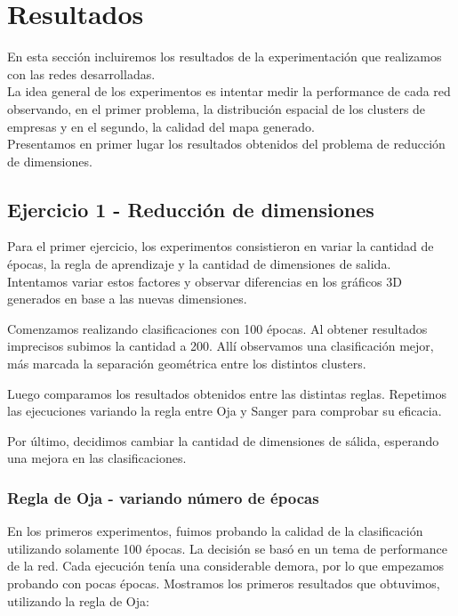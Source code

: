 \section{Resultados}
En esta sección incluiremos los resultados de la experimentación que realizamos con las redes desarrolladas.\\

La idea general de los experimentos es intentar medir la performance
de cada red observando, en el primer problema, la distribución espacial de los clusters de empresas y en el segundo, la calidad 
del mapa generado.\\

Presentamos en primer lugar los resultados obtenidos del problema de reducción de dimensiones.

\subsection{Ejercicio 1 - Reducción de dimensiones}

Para el primer ejercicio, los experimentos consistieron en variar la cantidad de épocas, la regla de aprendizaje y la cantidad de dimensiones de salida. Intentamos variar estos factores y observar diferencias en los gráficos 3D generados en base a las nuevas dimensiones.

Comenzamos realizando clasificaciones con 100 épocas. Al obtener resultados imprecisos subimos la cantidad a 200. Allí observamos una clasificación mejor, más marcada la separación geométrica entre los distintos clusters.

Luego comparamos los resultados obtenidos entre las distintas reglas. Repetimos las ejecuciones variando la regla entre Oja y Sanger para comprobar su eficacia.

Por último, decidimos cambiar la cantidad de dimensiones de sálida, esperando una mejora en las clasificaciones. 

\subsubsection{Regla de Oja - variando número de épocas}
En los primeros experimentos, fuimos probando la calidad de la clasificación utilizando solamente 100 épocas. La decisión se basó en un tema de performance de la red. Cada ejecución tenía una considerable demora, por lo que empezamos probando con pocas épocas. Mostramos los primeros resultados que obtuvimos, utilizando la regla de Oja:

